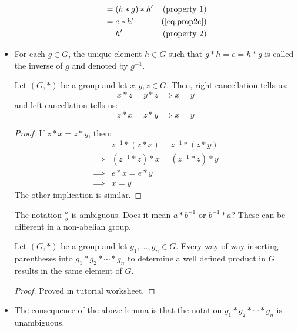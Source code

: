 \begin{itemize}
\begin{proposition}
\begin{align}
            &= (h*g)*h' & \text{(property 1)} \\ 
            &= e*h' & \text{(\ref{eq:prop2c})} \\ 
            &= h' & \text{(property 2)}
        \end{align}
    \end{proposition}
    \item For each $g\in G$, the unique element $h\in G$ such that $g*h=e=h*g$ is called the inverse of $g$ and denoted by $g^{-1}$.
    \begin{lemma}
        Let $(G,*)$ be a group and let $x,y,z \in G$. Then, right cancellation tells us:
        \begin{equation}
            x*z = y*z \implies x = y
        \end{equation}
        and left cancellation tells us:
        \begin{equation}
            z*x = z*y \implies x=y
        \end{equation}
        \begin{proof}
            If $z*x=z*y$, then:
            \begin{align}
                & z^{-1}*(z*x) = z^{-1}*(z*y) \\ 
                \implies & (z^{-1} * z) * x = (z^{-1} * z) * y \\ 
                \implies & e * x = e * y \\ 
                \implies & x = y
            \end{align}
            The other implication is similar.
        \end{proof}
    \end{lemma}
    \begin{warning}
        The notation $\frac{a}{b}$ is ambiguous. Does it mean $a*b^{-1}$ or $b^{-1}*a$? These can be different in a non-abelian group.
    \end{warning}
    \begin{lemma}
        Let $(G,*)$ be a group and let $g_1,\dots,g_n\in G$. Every way of way inserting parentheses into $g_1*g_2*\cdots*g_n$ to determine a well defined product in $G$ results in the same element of $G$.
        \begin{proof}
            Proved in tutorial worksheet.
        \end{proof}
    \end{lemma}
    \item The consequence of the above lemma is that the notation $g_1*g_2*\cdots*g_n$ is unambiguous.

\end{itemize}
